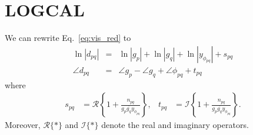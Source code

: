 \documentclass[useAMS,usenatbib]{mn2e}
\newcommand{\conj}[1]{\overline{#1}}
\begin{document}
% 
% 
% 







\appendix

\section{\textsc{LOGCAL}}
\label{sec:logcal}
We can rewrite Eq.~\eqref{eq:vis_red} to \citep{Liu2010}
\begin{eqnarray}
\ln |d_{pq}| &=& \ln |g_p| + \ln |g_q| + \ln |y_{\phi_{pq}}| + s_{pq} \label{eq:logcal_amp}\\
\angle d_{pq} &=& \angle g_p - \angle g_q + \angle \phi_{pq} + t_{pq} \label{eq:logcal_phase}
\end{eqnarray}
where
\begin{align}
s_{pq} &= \mathscr{R} \left \{1 + \frac{n_{pq}}{g_p\conj{g_q}y_{\phi_{pq}}} \right \}, & t_{pq} &= \mathscr{I}\left \{1 + \frac{n_{pq}}{g_p\conj{g_q}y_{\phi_{pq}}} \right \}.
\end{align}
Moreover, $\mathscr{R}\{*\}$ and $\mathscr{I}\{*\}$ denote the real and imaginary operators. 
\end{document}

